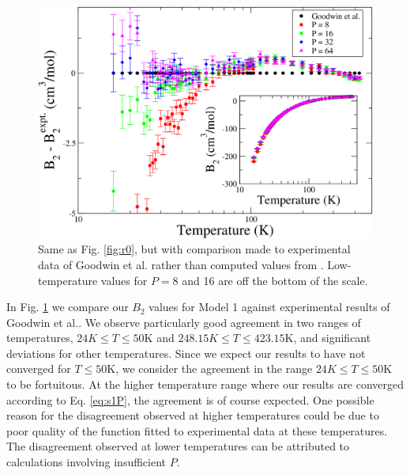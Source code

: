                 \begin{figure}[!htbp]
                    \centering
                    \includegraphics[scale=0.20,keepaspectratio]{Chapter-4/Figures/s1GoodwinAll.png}
                    \caption{Same as Fig. \ref{fig:r0}, but with comparison made to experimental data of Goodwin et al.\cite{Goodwin1963} rather than computed values from \cite{Garberoglio2014}. Low-temperature values for $P = 8$ and 16 are off the bottom of the scale.}
                    \label{fig:r0Goodwin}
                \end{figure}
                In Fig. \ref{fig:r0Goodwin} we compare our $B_2$ values for Model 1 against experimental results of Goodwin et al.\cite{Goodwin1963}. We observe particularly good agreement in two ranges of temperatures, $24 K \le T \le 50 $K and $ 248.15 K \le T \le 423.15 $K, and significant deviations for other temperatures. Since we expect our results to have not converged for $T \le 50 $K, we consider the agreement in the range $24 K \le T \le 50 $K to be fortuitous. At the higher temperature range where our results are converged according to Eq. \eqref{eq:s1P}, the agreement is of course expected. One possible reason for the disagreement observed at higher temperatures could be due to poor quality of the function fitted to experimental data at these temperatures. The disagreement observed at lower temperatures can be attributed to calculations involving insufficient $P$.

